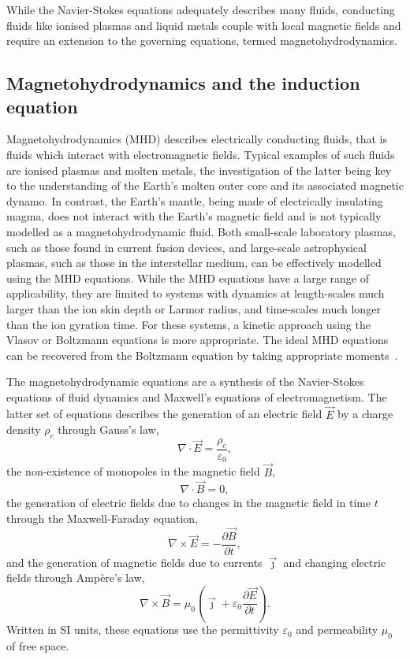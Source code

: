 While the Navier-Stokes equations adequately describes many fluids, conducting fluids like ionised plasmas and liquid metals couple with local magnetic fields and require an extension to the governing equations, termed magnetohydrodynamics.

\subsection{Magnetohydrodynamics and the induction equation}

Magnetohydrodynamics (MHD) describes electrically conducting fluids, that is fluids which interact with electromagnetic fields. Typical examples of such fluids are ionised plasmas and molten metals, the investigation of the latter being key to the understanding of the Earth's molten outer core and its associated magnetic dynamo. In contrast, the Earth's mantle, being made of electrically insulating magma, does not interact with the Earth's magnetic field and is not typically modelled as a magnetohydrodynamic fluid. Both small-scale laboratory plasmas, such as those found in current fusion devices, and large-scale astrophysical plasmas, such as those in the interstellar medium, can be effectively modelled using the MHD equations. While the MHD equations have a large range of applicability, they are limited to systems with dynamics at length-scales much larger than the ion skin depth or Larmor radius, and time-scales much longer than the ion gyration time. For these systems, a kinetic approach using the Vlasov or Boltzmann equations is more appropriate. The ideal MHD equations can be recovered from the Boltzmann equation by taking appropriate moments~\cite{boydPhysicsPlasmas2003}.

The magnetohydrodynamic equations are a synthesis of the Navier-Stokes equations of fluid dynamics and Maxwell's equations of electromagnetism. The latter set of equations describes the generation of an electric field $\vec{E}$ by a charge density $\rho_c$ through Gauss's law,
\begin{equation}
  \label{eq:gauss_law}
 \nabla \cdot \vec {E} ={\frac {\rho_c }{\varepsilon _{0}}},
\end{equation}
the non-existence of monopoles in the magnetic field $\vec{B}$,
\begin{equation}
  \label{eq:gauss_law_for_magnetism}
  \nabla \cdot \vec {B} =0,
\end{equation}
the generation of electric fields due to changes in the magnetic field in time $t$ through the Maxwell-Faraday equation,
\begin{equation}
  \label{eq:maxwell_faraday}
 \nabla \times \vec {E} =-{\frac {\partial \vec {B} }{\partial t}},
\end{equation}
and the generation of magnetic fields due to currents $\vec{\jmath}$ and changing electric fields through Ampère's law,
\begin{equation}
  \label{eq:ampere_law}
 \nabla \times \vec {B} =\mu _{0}\left(\vec {\jmath} +\varepsilon _{0}{\frac {\partial \vec {E} }{\partial t}}\right).
\end{equation}
Written in SI units, these equations use the permittivity $\varepsilon_{0}$ and permeability $\mu_0$ of free space.


